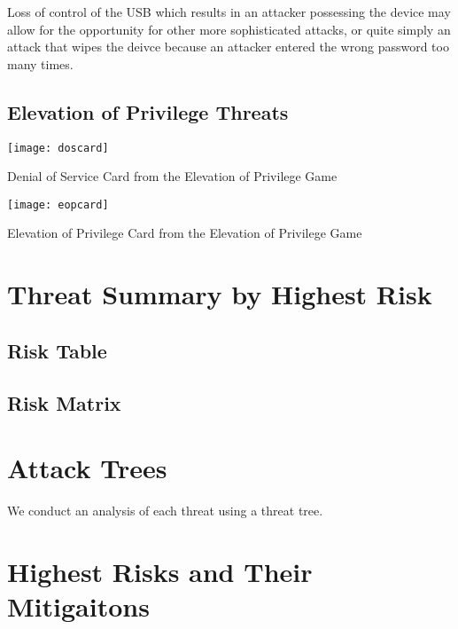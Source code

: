 Loss of control of the USB which results in an attacker possessing the device may allow for the opportunity for other more sophisticated attacks, or quite simply an attack that wipes the deivce because an attacker entered the wrong password too many times.





\subsection{Elevation of Privilege Threats}

\begin{marginfigure}%
\centering
  \texttt{[image: doscard]}
  \caption{Denial of Service Card from the Elevation of Privilege Game}
  \label{fig:doscard}
\end{marginfigure}

\begin{marginfigure}%
\centering
  \texttt{[image: eopcard]}
  \caption{Elevation of Privilege Card from the Elevation of Privilege Game}
  \label{fig:eopcard}
\end{marginfigure}


\section{Threat Summary by Highest Risk}

\subsection{Risk Table}

\subsection{Risk Matrix}

\section{Attack Trees}
We conduct an analysis of each threat using a threat tree.

\section{Highest Risks and Their Mitigaitons}




